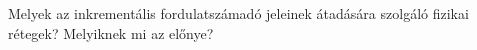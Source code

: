 \begin{example}

Melyek az inkrementális fordulatszámadó jeleinek átadására szolgáló fizikai rétegek? Melyiknek mi az előnye?

\tcbline
\vspace{1mm}

\solution

\end{example}